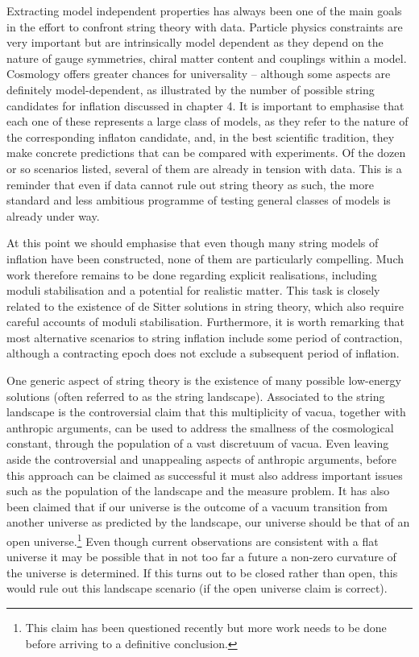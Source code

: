  Extracting model independent properties has always been one of the main goals in the effort to confront string theory with data. Particle physics constraints are very important but are intrinsically model dependent as they depend on the
 nature of gauge symmetries, chiral matter content and couplings within a model. Cosmology offers greater chances for universality -- although some aspects are definitely model-dependent, as illustrated by the number of possible string candidates for inflation discussed in chapter 4. It is important to emphasise that each one of these represents a large class of models, as they refer to the nature of the corresponding inflaton candidate, and, in the best scientific tradition, they make concrete predictions that can be compared with experiments. Of the dozen or so scenarios listed, several of them are already in tension with data. This is a reminder that even if data cannot rule out string theory as such, the more standard and less ambitious programme of testing general classes of models is already under way. 
 
At this point we should emphasise that even though many string models of inflation have been constructed, none of them are particularly compelling. Much work therefore remains to be done regarding explicit realisations,  including moduli stabilisation and a potential for realistic matter. This task is closely related to the existence of de Sitter solutions in string theory, which also require careful accounts of moduli stabilisation. Furthermore, it is worth remarking that most alternative scenarios to string inflation include some period of contraction, although a contracting epoch does not exclude a subsequent period of inflation. 

One generic aspect of string theory is the existence of many possible low-energy solutions (often referred to as the string landscape). Associated to the string landscape is the controversial claim that this multiplicity of vacua, together with anthropic arguments, can be used to address the smallness of the cosmological constant, through the population of a vast discretuum of vacua.  Even leaving aside the controversial and unappealing aspects of anthropic arguments, before this approach can be claimed as successful it must also address important issues such as the population of the landscape and the measure problem. It has also been claimed that if our universe is the outcome of a vacuum transition from another universe as predicted by the landscape,  our universe should be that of an open universe.\footnote{This claim has been questioned recently \cite{Hawking:2017wrd,Cespedes:2020xpn}  but more work needs to be done before arriving to a definitive conclusion.} Even though current observations are consistent with a flat universe it may be possible that in not too far a future a non-zero curvature of the universe is determined. If this turns out to be closed rather than open, this would rule out this landscape scenario (if the open universe claim is correct).

